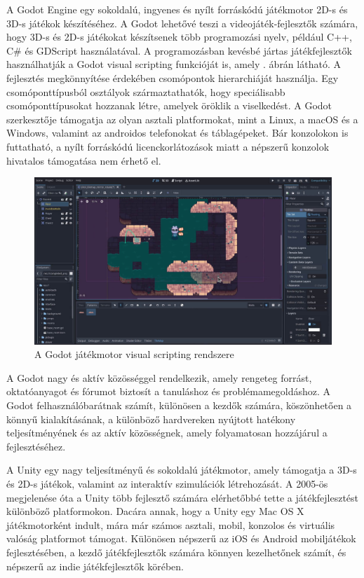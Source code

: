 A Godot Engine egy sokoldalú, ingyenes és nyílt forráskódú játékmotor 2D-s és 3D-s játékok készítéséhez. A Godot lehetővé teszi a videojáték-fejlesztők számára, hogy 3D-s és 2D-s játékokat készítsenek több programozási nyelv, például C++, C\# és GDScript használatával. A programozásban kevésbé jártas játékfejlesztők használhatják a Godot visual scripting funkcióját is, amely . ábrán látható. A fejlesztés megkönnyítése érdekében csomópontok hierarchiáját használja. Egy csomóponttípusból osztályok származtathatók, hogy speciálisabb csomóponttípusokat hozzanak létre, amelyek öröklik a viselkedést. A Godot szerkesztője támogatja az olyan asztali platformokat, mint a Linux, a macOS és a Windows, valamint az androidos telefonokat és táblagépeket. Bár konzolokon is futtatható, a nyílt forráskódú licenckorlátozások miatt a népszerű konzolok hivatalos támogatása nem érhető el.\cite{godot}

\begin{figure}[ht]
\centering
\includegraphics[scale = 0.2]{images/Godot_engine.jpg}
\caption{A Godot játékmotor visual scripting rendszere \cite{godot}}
\label{fig:godotengine}
\end{figure}

A Godot nagy és aktív közösséggel rendelkezik, amely rengeteg forrást, oktatóanyagot és fórumot biztosít a tanuláshoz és problémamegoldáshoz. A Godot felhasználóbarátnak számít, különösen a kezdők számára, köszönhetően a könnyű kialakításának, a különböző hardvereken nyújtott hatékony teljesítményének és az aktív közösségnek, amely folyamatosan hozzájárul a fejlesztéséhez. \cite{godot}


A Unity egy nagy teljesítményű és sokoldalú játékmotor, amely támogatja a 3D-s és 2D-s játékok, valamint az interaktív szimulációk létrehozását. A 2005-ös megjelenése óta a Unity több fejlesztő számára elérhetőbbé tette a játékfejlesztést különböző platformokon. Dacára annak, hogy a Unity egy Mac OS X játékmotorként indult, mára már számos asztali, mobil, konzolos és virtuális valóság platformot támogat. Különösen népszerű az iOS és Android mobiljátékok fejlesztésében, a kezdő játékfejlesztők számára könnyen kezelhetőnek számít, és népszerű az indie játékfejlesztők körében.

